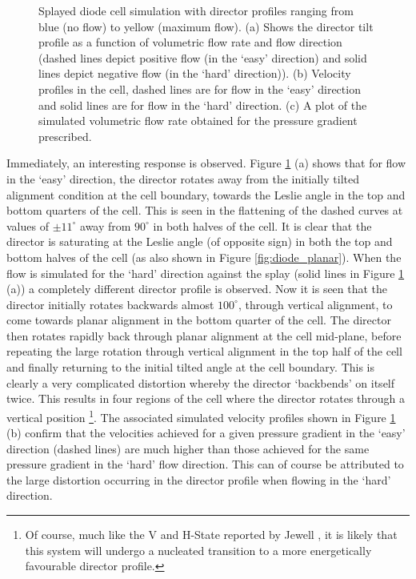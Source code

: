 \begin{figure}
\begin{center}
\end{center}
\caption[Simulated tilt, velocity and pressure gradients for a tilted splayed cell]{\label{fig:diode_tilt} Splayed diode cell simulation with director profiles ranging from blue (no flow) to yellow (maximum flow). (a) Shows the director tilt profile as a function of volumetric flow rate and flow direction (dashed lines depict positive flow (in the `easy' direction) and solid lines depict negative flow (in the `hard' direction)). (b) Velocity profiles in the cell, dashed lines are for flow in the `easy' direction and solid lines are for flow in the `hard' direction. (c) A plot of the simulated volumetric flow rate obtained for the pressure gradient prescribed. }
\end{figure}

Immediately, an interesting response is observed. Figure \ref{fig:diode_tilt} (a) shows that for flow in the `easy' direction, the director  rotates away from the initially tilted alignment condition at the cell boundary, towards the Leslie angle in the top and bottom quarters of the cell. This is seen in the flattening of the dashed curves at values of $\pm11^{\circ}$ away from $90^{\circ}$ in both halves of the cell. It is clear that the director is saturating at the Leslie angle (of opposite sign) in both the top and bottom halves of the cell (as also shown in Figure \ref{fig:diode_planar}). When the flow is simulated for the `hard' direction against the splay (solid lines in Figure \ref{fig:diode_tilt} (a)) a completely different director profile is observed. Now it is seen that the director initially rotates backwards almost $100^{\circ}$, through vertical alignment, to come towards planar alignment in the bottom quarter of the cell. The director then rotates rapidly back through planar alignment at the cell mid-plane, before repeating the large rotation through vertical alignment in the top half of the cell and finally returning to the initial tilted angle at the cell boundary. This is clearly a very complicated distortion whereby the director `backbends' on itself twice. This results in four regions of the cell where the director rotates through a vertical position \footnote{Of course, much like the V and H-State reported by Jewell \cite{Jewell2009}, it is likely that this system will undergo a nucleated transition to a more energetically favourable director profile.}. The associated simulated velocity profiles shown in Figure \ref{fig:diode_tilt} (b) confirm that the velocities achieved for a given pressure gradient in the `easy' direction (dashed lines) are much higher than those achieved for the same pressure gradient in the `hard' flow direction. This can of course be attributed to the large distortion occurring in the director profile when flowing in the `hard' direction.
